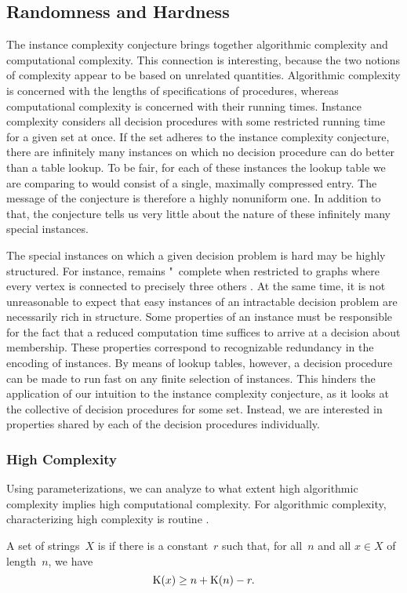 \subsection{Randomness and Hardness}
\label{sec:algorithmic:randomness_hardness}%
The instance complexity conjecture brings together algorithmic complexity and computational complexity.
This connection is interesting, because the two notions of complexity appear to be based on unrelated quantities.
Algorithmic complexity is concerned with the lengths of specifications of procedures, whereas computational complexity is concerned with their running times.
Instance complexity considers all decision procedures with some restricted running time for a given set at once.
If the set adheres to the instance complexity conjecture, there are infinitely many instances on which no decision procedure can do better than a table lookup.
To be fair, for each of these instances the lookup table we are comparing to would consist of a single, maximally compressed entry.
The message of the conjecture is therefore a highly nonuniform one.
In addition to that, the conjecture tells us very little about the nature of these infinitely many special instances.

The special instances on which a given decision problem is hard may be highly structured.
For instance,  remains "~complete when restricted to graphs where every vertex is connected to precisely three others \parencite{garey1979computers}.
At the same time, it is not unreasonable to expect that easy instances of an intractable decision problem are necessarily rich in structure.
Some properties of an instance must be responsible for the fact that a reduced computation time suffices to arrive at a decision about membership.
These properties correspond to recognizable redundancy in the encoding of instances.
By means of lookup tables, however, a decision procedure can be made to run fast on any finite selection of instances.
This hinders the application of our intuition to the instance complexity conjecture, as it looks at the collective of decision procedures for some set.
Instead, we are interested in properties shared by each of the decision procedures individually.

\subsubsection{High Complexity}
Using parameterizations, we can analyze to what extent high algorithmic complexity implies high computational complexity.
For algorithmic complexity, characterizing high complexity is routine \parencite[Theorem~3.3.1]{li2008introduction}.
\begin{definition}
\label{def:random}%
  A set of strings~$X$ is  if there is a constant~$r$ such that, for all~$n$ and all $x \in X$ of length~$n$, we have
  \begin{equation*}
    \operatorname{K}(x) \ge n + \operatorname{K}(n) - r.
  \end{equation*}
\end{definition}


